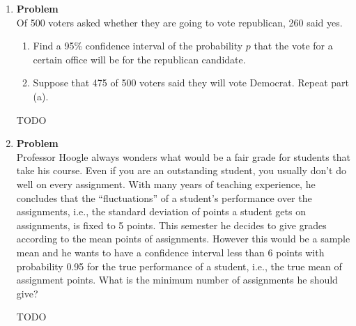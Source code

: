 \documentclass[12pt]{article}
\newenvironment{Ex}{\textbf{Problem}\vspace{.75em}\\}{}
\begin{document}
\begin{enumerate}
\begin{Ex}
\begin{enumerate}
      first date, how should Romeo use this information to update the
      distribution of $\theta$?
    \item Find the MAP estimate of $\theta$ based on the observation
      $X = x$.
    \item Find the Least Mean Square estimate of $\theta$ based on the
      observation $X = x$.
    \item Derive the Linear Least Mean Square estimator of $\theta$
      based on $X$.
    \end{enumerate}
    \begin{solution} \hfill
      {\huge \color{red} TODO}
    \end{solution}
  \end{Ex}
\item 
  \begin{Ex}
    Of 500 voters asked whether they are going to vote republican, 260
    said yes.
    \begin{enumerate}
    \item Find a 95\% confidence interval of the probability $p$ that
      the vote for a certain office will be for the republican
      candidate.
    \item Suppose that 475 of 500 voters said they will vote
      Democrat. Repeat part (a).
    \end{enumerate}
    \begin{solution} \hfill
      {\huge \color{red} TODO}
    \end{solution}
  \end{Ex}
\item 
  \begin{Ex}
    Professor Hoogle always wonders what would be a fair grade for
    students that take his course. Even if you are an outstanding
    student, you usually don’t do well on every assignment. With many
    years of teaching experience, he concludes that the
    ``fluctuations'' of a student’s performance over the assignments,
    i.e., the standard deviation of points a student gets on
    assignments, is fixed to 5 points. This semester he decides to
    give grades according to the mean points of assignments. However
    this would be a sample mean and he wants to have a confidence
    interval less than 6 points with probability 0.95 for the true
    performance of a student, i.e., the true mean of assignment
    points. What is the minimum number of assignments he should give?
    \begin{solution} \hfill
      {\huge \color{red} TODO}
    \end{solution}
  \end{Ex}
\end{enumerate}
\end{document}
